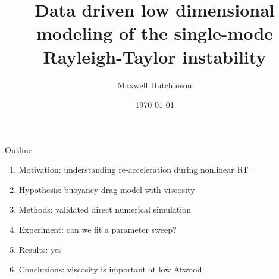 \documentclass[12pt]{beamer}
\title[RTI Models]{Data driven low dimensional modeling of the single-mode Rayleigh-Taylor instability}
\author{Maxwell Hutchinson}
\institute[UofC]{University of Chicago}
\date{\today}
\begin{document}

\newcommand{\pder}[2] {\frac{\partial #1}{\partial #2}}
\newcommand{\ppder}[2] {\frac{\partial^2 #1}{\partial #2^2}}
\newcommand{\der}[2] {\frac{d #1}{d #2}}
\newcommand{\dder}[2] {\frac{d^2 #1}{d #2^2}}
 
\maketitle

\begin{frame}{Outline}
\begin{enumerate}
  \item Motivation: understanding re-acceleration during nonlinear RT
  \item Hypothesis: buoyancy-drag model with viscosity
  \item Methods: validated direct numerical simulation
  \item Experiment: can we fit a parameter sweep?
  \item Results: yes
  \item Conclusions: viscosity is important at low Atwood
\end{enumerate}

\end{frame}

\end{document}

